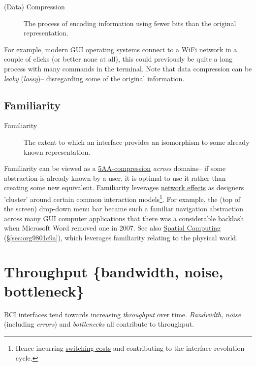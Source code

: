 \documentclass[logo,bsc,singlespacing,parskip]{infthesis}
\begin{document}
\begin{mdframed}
\begin{description}
\item[{(Data) Compression\label{compression}}] The process of encoding information using fewer bits than the original representation.
\end{description}
\end{mdframed}

For example, modern GUI operating systems connect to a WiFi network in a couple of clicks (or better none at all), this could previously be quite a long process with many commands in the terminal.
Note that data compression can be \emph{leaky} (\emph{lossy})-- disregarding some of the original information.

\subsection{Familiarity}
\label{sec:org8e50c21}
\medskip
\begin{mdframed}
\begin{description}
\item[{Familiarity\label{familiarity}}] The extent to which an interface provides an isomorphism to some already known representation.
\end{description}
\end{mdframed}

Familiarity can be viewed as a \hyperref[compression]{5AA-compression} \emph{across} domains-- if some abstraction is already known by a user, it is optimal to use it rather than creating some new equivalent.
Familiarity leverages \hyperref[network effects]{network effects} as designers 'cluster' around certain common interaction models\footnote{Hence incurring \hyperref[switching costs]{switching costs} and contributing to the interface revolution cycle.}.
For example, the (top of the screen) drop-down menu bar became such a familiar navigation abstraction across many GUI computer applications that there was a considerable backlash when Microsoft Word removed one in 2007.
See also \hyperref[sec:org9801c9a]{Spatial Computing} (\S \ref{sec:org9801c9a}), which leverages familiarity relating to the physical world.

\section{Throughput \{bandwidth, noise, bottleneck\}}
\label{sec:orgf7efab3}
BCI interfaces tend towards increasing \emph{throughput} over time. \emph{Bandwidth}, \emph{noise} (including \emph{errors}) and \emph{bottlenecks} all contribute to throughput.
\end{document}
